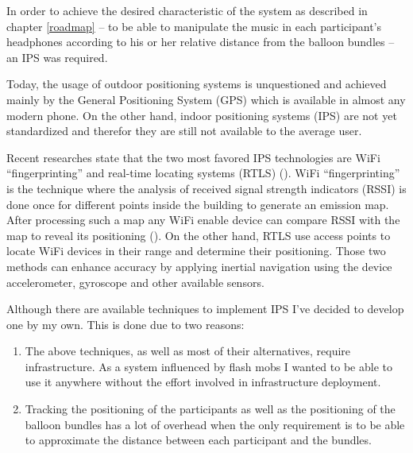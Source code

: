 In order to achieve the desired characteristic of the system as described in chapter \ref{roadmap} -- to be able to manipulate the music in each participant's headphones according to his or her relative distance from the balloon bundles -- an IPS was required.

Today, the usage of outdoor positioning systems is unquestioned and achieved mainly by the General Positioning System (GPS) which is available in almost any modern phone. On the other hand, indoor positioning systems (IPS) are not yet standardized and therefor they are still not available to the average user.

Recent researches state that the two most favored IPS technologies are WiFi ``fingerprinting'' and real-time locating systems (RTLS) (\href{http://www.idtechex.com/research/articles/the-rise-of-mobile-phone-indoor-positioning-systems-00005684.asp}{}). WiFi ``fingerprinting'' is the technique where the analysis of received signal strength indicators (RSSI) is done once for different points inside the building to generate an emission map. After processing such a map any WiFi enable device can compare RSSI with the map to reveal its positioning (\href{http://ieeexplore.ieee.org/xpl/login.jsp?tp=&arnumber=996891&url=http%3A%2F%2Fieeexplore.ieee.org%2Fxpls%2Fabs_all.jsp%3Farnumber%3D996891}{\todo{finish ref}}). On the other hand, RTLS use access points to locate WiFi devices in their range and determine their positioning. Those two methods can enhance accuracy by applying inertial navigation using the device accelerometer, gyroscope and other available sensors.

Although there are available techniques to implement IPS I've decided to develop one by my own. This is done due to two reasons:
\begin{enumerate}
	\item The above techniques, as well as most of their alternatives, require infrastructure. As a system influenced by flash mobs I wanted to be able to use it anywhere without the effort involved in infrastructure deployment.
	\item Tracking the positioning of the participants as well as the positioning of the balloon bundles has a lot of overhead when the only requirement is to be able to approximate the distance between each participant and the bundles.
\end{enumerate}


